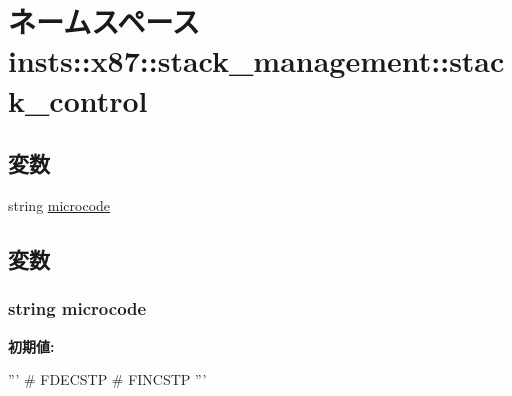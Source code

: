 \hypertarget{namespaceinsts_1_1x87_1_1stack__management_1_1stack__control}{
\section{ネームスペース insts::x87::stack\_\-management::stack\_\-control}
\label{namespaceinsts_1_1x87_1_1stack__management_1_1stack__control}
}
\subsection*{変数}
\begin{DoxyCompactItemize}
\item 
string \hyperlink{namespaceinsts_1_1x87_1_1stack__management_1_1stack__control_a770f11a173e99389a8802f0107ed8f52}{microcode}
\end{DoxyCompactItemize}


\subsection{変数}
\hypertarget{namespaceinsts_1_1x87_1_1stack__management_1_1stack__control_a770f11a173e99389a8802f0107ed8f52}{
\subsubsection[{microcode}]{\setlength{\rightskip}{0pt plus 5cm}string {\bf microcode}}}
\label{namespaceinsts_1_1x87_1_1stack__management_1_1stack__control_a770f11a173e99389a8802f0107ed8f52}
{\bfseries 初期値:}
\begin{DoxyCode}
'''
# FDECSTP
# FINCSTP
'''
\end{DoxyCode}
